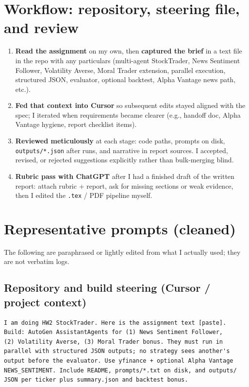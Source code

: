 \documentclass[11pt]{article}
\begin{document}
\section{Workflow: repository, steering file, and review}

\begin{enumerate}
  \item \textbf{Read the assignment} on my own, then \textbf{captured the brief} in a text file in the repo with any particulars (multi-agent StockTrader, News Sentiment Follower, Volatility Averse, Moral Trader extension, parallel execution, structured JSON, evaluator, optional backtest, Alpha Vantage news path, etc.).
  \item \textbf{Fed that context into Cursor} so subsequent edits stayed aligned with the spec; I iterated when requirements became clearer (e.g., handoff doc, Alpha Vantage hygiene, report checklist items).
  \item \textbf{Reviewed meticulously} at each stage: code paths, prompts on disk, \texttt{outputs/*.json} after runs, and narrative in report sources. I accepted, revised, or rejected suggestions explicitly rather than bulk-merging blind.
  \item \textbf{Rubric pass with ChatGPT} after I had a finished draft of the written report: attach rubric + report, ask for missing sections or weak evidence, then I edited the \texttt{.tex} / PDF pipeline myself.
\end{enumerate}

\section{Representative prompts (cleaned)}
The following are paraphrased or lightly edited from what I actually used; they are not verbatim logs.

\subsection*{Repository and build steering (Cursor / project context)}
\begin{verbatim}
I am doing HW2 StockTrader. Here is the assignment text [paste].
Build: AutoGen AssistantAgents for (1) News Sentiment Follower,
(2) Volatility Averse, (3) Moral Trader bonus. They must run in
parallel with structured JSON outputs; no strategy sees another's
output before the evaluator. Use yfinance + optional Alpha Vantage
NEWS_SENTIMENT. Include README, prompts/*.txt on disk, and outputs/
JSON per ticker plus summary.json and backtest bonus.
\end{verbatim}
\end{document}
